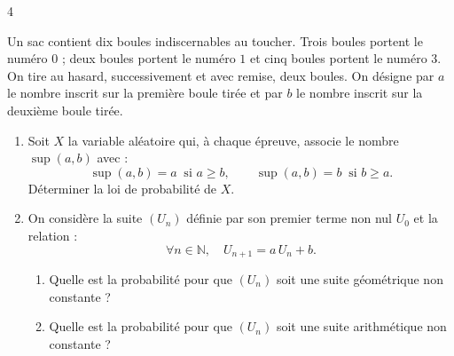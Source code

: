 \documentclass{axiobac}
\begin{document}
\begin{exercice}{4}

Un sac contient dix boules indiscernables au toucher. Trois boules portent le numéro $0$ ; deux boules portent le numéro $1$ et cinq boules portent le numéro $3$. \\
On tire au hasard, successivement et avec remise, deux boules. On désigne par $a$ le nombre inscrit sur la première boule tirée et par $b$ le nombre inscrit sur la deuxième boule tirée.

\begin{enumerate}
    \item Soit $X$ la variable aléatoire qui, à chaque épreuve, associe le nombre $\sup(a, b)$ avec :
    \[
    \sup(a, b) = a \ \text{ si } a \geqslant b, \qquad \sup(a, b) = b \ \text{ si } b \geqslant a .
    \]
    Déterminer la loi de probabilité de $X$.
    \item On considère la suite $(U_n)$ définie par son premier terme non nul $U_0$ et la relation :
    \[
    \forall n \in \mathbb{N}, \quad U_{n+1} = a\,U_n + b .
    \]
    \begin{enumerate}
        \item Quelle est la probabilité pour que $(U_n)$ soit une suite géométrique non constante ?
        \item Quelle est la probabilité pour que $(U_n)$ soit une suite arithmétique non constante ?
    \end{enumerate}
\end{enumerate}

\end{exercice}
\end{document}
